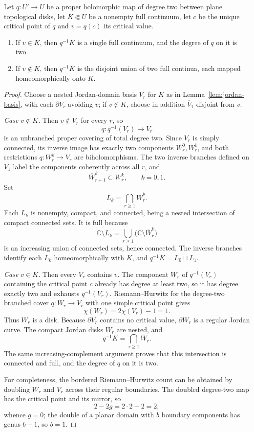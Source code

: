 \begin{lemma}
\label{lem:quadratic-pullback-dichotomy}
Let \(q:U'\to U\) be a proper holomorphic map of degree two between
plane topological disks, let \(K\Subset U\) be a nonempty full
continuum, let \(c\) be the unique critical point of \(q\) and
\(v=q(c)\) its critical value.
\begin{enumerate}
\item If \(v\in K\), then \(q^{-1}K\) is a single full continuum, and
      the degree of \(q\) on it is two.
\item If \(v\notin K\), then \(q^{-1}K\) is the disjoint union of two
      full continua, each mapped homeomorphically onto \(K\).
\end{enumerate}
\end{lemma}

\begin{proof}
Choose a nested Jordan-domain basis \(V_r\) for \(K\) as in
Lemma~\ref{lem:jordan-basis}, with each \(\partial V_r\) avoiding
\(v\); if \(v\notin K\), choose in addition \(\overline V_1\) disjoint
from \(v\).

\emph{Case \(v\notin K\).}  Then \(v\notin V_r\) for every \(r\), so
\[
 q:q^{-1}(V_r)\longrightarrow V_r
\]
is an unbranched proper covering of total degree two.  Since \(V_r\)
is simply connected, its inverse image has exactly two components
\(W_r^0,W_r^1\), and both restrictions \(q:W_r^k\to V_r\) are
biholomorphisms.  The two inverse branches defined on \(V_1\) label
the components coherently across all \(r\), and
\[
 \overline W_{r+1}^k\subset W_r^k,\qquad k=0,1 .
\]
Set
\[
 L_k=\bigcap_{r\ge1}\overline W_r^k .
\]
Each \(L_k\) is nonempty, compact, and connected, being a nested
intersection of compact connected sets.  It is full because
\[
 \mathbb C\setminus L_k
 =
 \bigcup_{r\ge1}\bigl(\mathbb C\setminus\overline W_r^k\bigr)
\]
is an increasing union of connected sets, hence connected.  The inverse
branches identify each \(L_k\) homeomorphically with \(K\), and
\(q^{-1}K=L_0\sqcup L_1\).

\emph{Case \(v\in K\).}  Then every \(V_r\) contains \(v\).  The
component \(W_r\) of \(q^{-1}(V_r)\) containing the critical point
\(c\) already has degree at least two, so it has degree exactly two
and exhausts \(q^{-1}(V_r)\).  Riemann--Hurwitz for the degree-two
branched cover \(q:W_r\to V_r\) with one simple critical point gives
\[
 \chi(W_r)=2\chi(V_r)-1=1 .
\]
Thus \(W_r\) is a disk.  Because \(\partial V_r\) contains no critical
value, \(\partial W_r\) is a regular Jordan curve.  The compact Jordan
disks \(\overline W_r\) are nested, and
\[
 q^{-1}K=\bigcap_{r\ge1}\overline W_r .
\]
The same increasing-complement argument proves that this intersection
is connected and full, and the degree of \(q\) on it is two.

For completeness, the bordered Riemann--Hurwitz count can be obtained
by doubling \(W_r\) and \(V_r\) across their regular boundaries.  The
doubled degree-two map has the critical point and its mirror, so
\[
 2-2g=2\cdot2-2=2,
\]
whence \(g=0\); the double of a planar domain with \(b\) boundary
components has genus \(b-1\), so \(b=1\).
\end{proof}